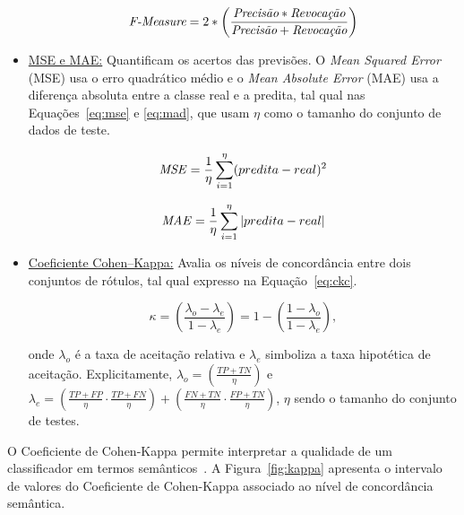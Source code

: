 \begin{itemize}
    \begin{equation}\label{eq:fmeasure}
        \textit{\textit{F-Measure}} = 2 * \left( \frac{ \textit{Precisão} * \textit{Revocação}} { \textit{Precisão} + \textit{Revocação} } \right)
    \end{equation}
    
    \item 
    \underline{MSE e MAE:}
    Quantificam os acertos das previsões.
    O \textit{Mean Squared Error} (MSE) usa o erro quadrático médio e o \textit{Mean Absolute Error} (MAE) usa a diferença absoluta entre a classe real e a predita, tal qual nas Equações~\eqref{eq:mse} e \eqref{eq:mad}, que usam $\eta$ como o tamanho do conjunto de dados de teste. 
    
    \begin{equation} \label{eq:mse}
        \text{\textit{MSE}} =  \frac{1}{\eta} \sum^\eta_{i=1} (predita - real)^2
    \end{equation}
    
    \begin{equation} \label{eq:mad}
        \text{\textit{MAE}} =  \frac{1}{\eta} \sum^\eta_{i=1} |predita - real|
    \end{equation}
    
    \item 
    \underline{Coeficiente Cohen--Kappa:}
    Avalia os níveis de concordância entre dois conjuntos de rótulos, tal qual expresso na Equação~\ref{eq:ckc}.

    \begin{equation} \label{eq:ckc}
        \kappa = \left( \frac{\lambda_o - \lambda_e} {1 - \lambda_e} \right) =  1 - \left( \frac{1 - \lambda_o} {1 - \lambda_e} \right),
    \end{equation}

    onde $\lambda_o$ é a taxa de aceitação relativa e $\lambda_e$ simboliza a taxa hipotética de aceitação.
    Explicitamente, $\lambda_o = ( \frac{TP+TN}{\eta} )$ e $\lambda_e = (\frac{TP+FP}{\eta} \cdot \frac{TP+FN}{\eta}) + (\frac{FN+TN}{\eta} \cdot \frac{FP+TN}{\eta})$, $\eta$ sendo o tamanho do conjunto de testes.
    
\end{itemize}

O Coeficiente de Cohen-Kappa permite interpretar a qualidade de um classificador em termos semânticos~\cite{Sim2005}.
A Figura~\ref{fig:kappa} apresenta o intervalo de valores do Coeficiente de Cohen-Kappa associado ao nível de concordância semântica.

